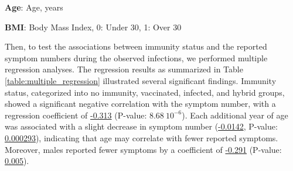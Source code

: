 \documentclass[11pt]{article}
\begin{document}
\begin{table}[h]
\caption{\protect\hyperlink{file-table-0-pkl}{Descriptive statistics of age and body mass index stratified by sex}}
\label{table:descriptive_statistics}
\begin{threeparttable}
\renewcommand{\TPTminimum}{\linewidth}
\begin{tablenotes}
\footnotesize
\item \textbf{Age}: Age, years
\item \textbf{BMI}: Body Mass Index, 0: Under 30, 1: Over 30
\end{tablenotes}
\end{threeparttable}
\end{table}

Then, to test the associations between immunity status and the reported symptom numbers during the observed infections, we performed multiple regression analyses. The regression results as summarized in Table \ref{table:multiple_regression} illustrated several significant findings. Immunity status, categorized into no immunity, vaccinated, infected, and hybrid groups, showed a significant negative correlation with the symptom number, with a regression coefficient of \hyperlink{B1a}{-0.313} (P-value: \hyperlink{B1c}{$8.68\ 10^{-6}$}). Each additional year of age was associated with a slight decrease in symptom number (\hyperlink{B3a}{-0.0142}, P-value: \hyperlink{B3c}{0.000293}), indicating that age may correlate with fewer reported symptoms. Moreover, males reported fewer symptoms by a coefficient of \hyperlink{B4a}{-0.291} (P-value: \hyperlink{B4c}{0.005}).
\end{document}
